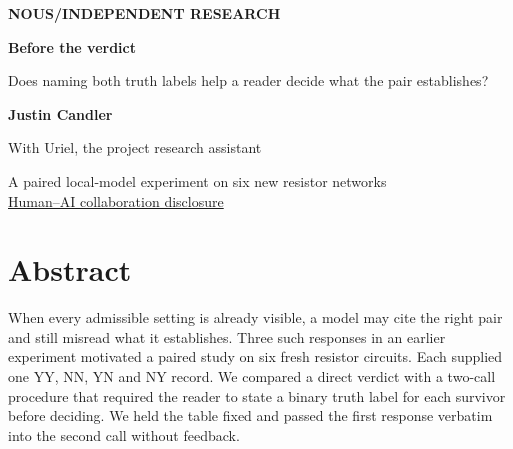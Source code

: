 \documentclass[12pt,letterpaper]{article}
\begin{document}


\thispagestyle{empty}
\begin{center}
\vspace*{.44in}
{\sffamily\small\bfseries\color{accent}NOUS\enspace /\enspace INDEPENDENT RESEARCH}\par
\vspace{.67in}
{\fontsize{39}{44}\selectfont\bfseries\color{ink}Before the verdict\par}
\vspace{.27in}
\begin{minipage}{.86\linewidth}\centering\Large\color{mute}Does naming both truth labels help a reader decide what the pair establishes?\end{minipage}\par
\vspace{.57in}
{\large\bfseries Justin Candler}\par
{\small With Uriel, the project research assistant}\par
\vspace{.19in}{\small 24 November 2026}\par
\vspace{.5in}\par
\end{center}\vfill
\begin{center}\small A paired local-model experiment on six new resistor networks\\[4pt]
\hyperref[collab]{Human--AI collaboration disclosure}\end{center}
\clearpage{}


\section*{Abstract}

When every admissible setting is already visible, a model may cite the right pair and still misread what it establishes. Three such responses in an earlier experiment motivated a paired study on six fresh resistor circuits. Each supplied one YY, NN, YN and NY record. We compared a direct verdict with a two-call procedure that required the reader to state a binary truth label for each survivor before deciding. We held the table fixed and passed the first response verbatim into the second call without feedback.
\end{document}
